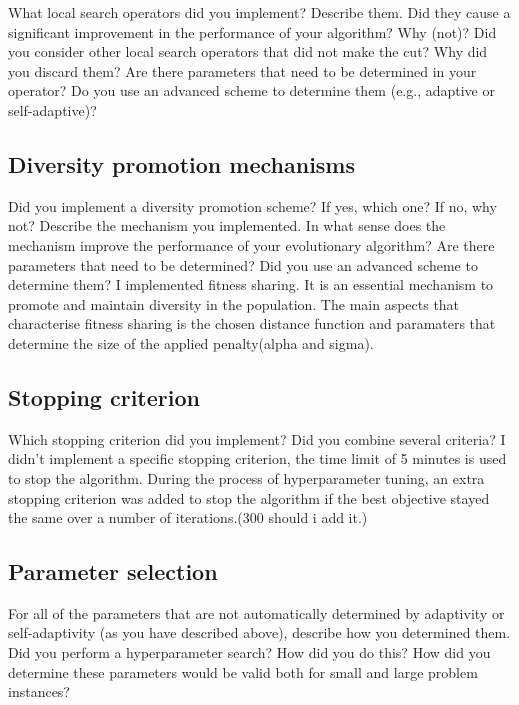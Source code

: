 \documentclass[a4paper,10pt]{article}
\newcommand{\ReplaceMe}[1]{{\color{blue}#1}}
\begin{document}
\ReplaceMe{What local search operators did you implement? Describe them. Did they cause a significant improvement in the performance of your algorithm? Why (not)? Did you consider other local search operators that did not make the cut? Why did you discard them? Are there parameters that need to be determined in your operator? Do you use an advanced scheme to determine them (e.g., adaptive or self-adaptive)?}

\subsection{Diversity promotion mechanisms}

\ReplaceMe{Did you implement a diversity promotion scheme? If yes, which one? If no, why not? Describe the mechanism you implemented. In what sense does the mechanism improve the performance of your evolutionary algorithm? Are there parameters that need to be determined? Did you use an advanced scheme to determine them?}
I implemented fitness sharing. It is an essential mechanism to promote and maintain diversity in the population. The main aspects that characterise fitness sharing is the chosen distance function and paramaters that determine the size of the applied penalty(alpha and sigma).

\subsection{Stopping criterion}

\ReplaceMe{Which stopping criterion did you implement? Did you combine several criteria?}
I didn't implement a specific stopping criterion, the time limit of 5 minutes is used to stop the algorithm. During the process of hyperparameter tuning, an extra stopping criterion was added to stop the algorithm if the best objective stayed the same over a number of iterations.(300 should i add it.)

\subsection{Parameter selection}

\ReplaceMe{For all of the parameters that are not automatically determined by adaptivity or self-adaptivity (as you have described above), describe how you determined them. Did you perform a hyperparameter search? How did you do this? How did you determine these parameters would be valid both for small and large problem instances?}
\end{document}

